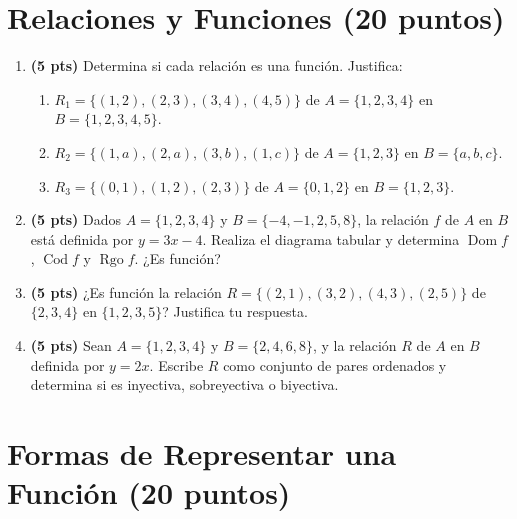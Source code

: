 \documentclass[12pt, letterpaper]{article}
\newcommand{\Dom}{\operatorname{Dom}}
\newcommand{\Cod}{\operatorname{Cod}}
\newcommand{\Rgo}{\operatorname{Rgo}}
\begin{document}
\newpage

\section{Relaciones y Funciones (20 puntos)}

\begin{enumerate}[leftmargin=*]
  \item \textbf{(5 pts)} Determina si cada relación es una función. Justifica:
        \begin{enumerate}[label=\alph*)]
          \item $R_1 = \{(1,2), (2,3), (3,4), (4,5)\}$ de $A = \{1,2,3,4\}$ en $B = \{1,2,3,4,5\}$.
          \item $R_2 = \{(1,a), (2,a), (3,b), (1,c)\}$ de $A = \{1,2,3\}$ en $B = \{a,b,c\}$.
          \item $R_3 = \{(0,1), (1,2), (2,3)\}$ de $A = \{0,1,2\}$ en $B = \{1,2,3\}$.
        \end{enumerate}

  \item \textbf{(5 pts)} Dados $A = \{1, 2, 3, 4\}$ y $B = \{-4, -1, 2, 5, 8\}$, la relación $f$ de $A$ en $B$ está definida por $y = 3x - 4$. Realiza el diagrama tabular y determina $\Dom f$, $\Cod f$ y $\Rgo f$. ¿Es función?

  \item \textbf{(5 pts)} ¿Es función la relación $R = \{(2,1), (3,2), (4,3), (2,5)\}$ de $\{2,3,4\}$ en $\{1,2,3,5\}$? Justifica tu respuesta.

  \item \textbf{(5 pts)} Sean $A = \{1,2,3,4\}$ y $B = \{2,4,6,8\}$, y la relación $R$ de $A$ en $B$ definida por $y = 2x$. Escribe $R$ como conjunto de pares ordenados y determina si es inyectiva, sobreyectiva o biyectiva.
\end{enumerate}

\newpage

\section{Formas de Representar una Función (20 puntos)}
\end{document}
